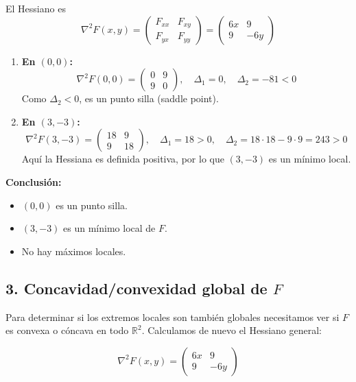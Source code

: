 \documentclass{article}
\newcommand{\R}{\ensuremath{\mathbb{R}}}
\begin{document}
El Hessiano es
\[
\nabla^2 F(x,y)
=
\begin{pmatrix}
F_{xx} & F_{xy}\\[4pt]
F_{yx} & F_{yy}
\end{pmatrix}
=
\begin{pmatrix}
6x & 9\\[4pt]
9  & -6y
\end{pmatrix}
\]

\begin{enumerate}
  \item \textbf{En \((0,0)\):}
  \[
  \nabla^2 F(0,0)
  = \begin{pmatrix}0 & 9\\[4pt]9 & 0\end{pmatrix},
  \quad \Delta_1 = 0,\quad
  \Delta_2  = -81 < 0
  \]
  Como \(\Delta_2<0\), es un punto silla (saddle point).

  \item \textbf{En \((3,-3)\):}
  \[
  \nabla^2 F(3,-3)
  = \begin{pmatrix}18 & 9\\[4pt]9 & 18\end{pmatrix},
  \quad \Delta_1 = 18 > 0,\quad
  \Delta_2 = 18\cdot18 - 9\cdot9 = 243 > 0
  \]
  Aquí la Hessiana es definida positiva, por lo que \((3,-3)\) es un mínimo local.
\end{enumerate}

\medskip

\noindent\textbf{Conclusión:}
\begin{itemize}
  \item \color{teal} \((0,0)\) es un punto silla.
  \item \color{teal} \((3,-3)\) es un mínimo local de \(F\).
  \item \color{teal} No hay máximos locales.
\end{itemize}

\subsection*{3. Concavidad/convexidad global de \(F\)}

Para determinar si los extremos locales son también globales necesitamos ver si \(F\) es convexa o cóncava en todo \(\R^2\). Calculamos de nuevo el Hessiano general:

\[
\nabla^2 F(x,y)
=
\begin{pmatrix}
6x & 9\\[4pt]
9  & -6y
\end{pmatrix}
\]
\end{document}

